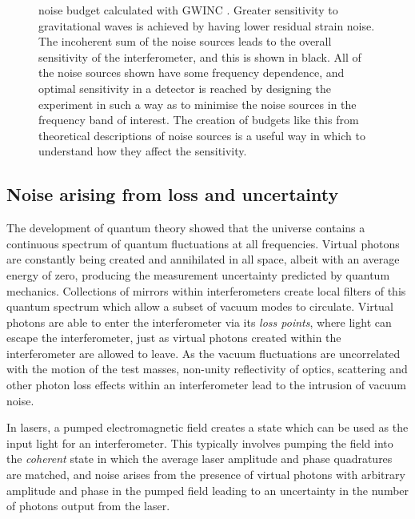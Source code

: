 \begin{figure}
  \centering
  
  \caption[Advanced LIGO noise budget]{\label{fig:aligo-noise-budget}\ALIGO{} noise budget calculated with \gls{GWINC} \cite{gwinc}. Greater sensitivity to gravitational waves is achieved by having lower residual strain noise. The incoherent sum of the noise sources leads to the overall sensitivity of the interferometer, and this is shown in black. All of the noise sources shown have some frequency dependence, and optimal sensitivity in a detector is reached by designing the experiment in such a way as to minimise the noise sources in the frequency band of interest. The creation of budgets like this from theoretical descriptions of noise sources is a useful way in which to understand how they affect the sensitivity.}
\end{figure}

\subsection{\label{sec:noise-via-loss}Noise arising from loss and uncertainty}
The development of quantum theory showed that the universe contains a continuous spectrum of quantum fluctuations at all frequencies. Virtual photons are constantly being created and annihilated in all space, albeit with an average energy of zero, producing the measurement uncertainty predicted by quantum mechanics. Collections of mirrors within interferometers create local filters of this quantum spectrum which allow a subset of vacuum modes to circulate. Virtual photons are able to enter the interferometer via its \emph{loss points}, where light can escape the interferometer, just as virtual photons created within the interferometer are allowed to leave. As the vacuum fluctuations are uncorrelated with the motion of the test masses, non-unity reflectivity of optics, scattering and other photon loss effects within an interferometer lead to the intrusion of vacuum noise.

In lasers, a pumped electromagnetic field creates a state which can be used as the input light for an interferometer. This typically involves pumping the field into the \emph{coherent} state in which the average laser amplitude and phase quadratures are matched, and noise arises from the presence of virtual photons with arbitrary amplitude and phase in the pumped field leading to an uncertainty in the number of photons output from the laser.

